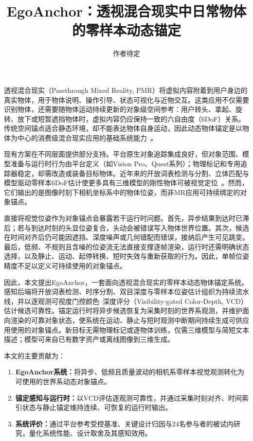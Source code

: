 \documentclass[review]{vgtc}
\title{EgoAnchor：透视混合现实中日常物体的零样本动态锚定}
\author{作者待定}
\begin{document}
\label{sec:introduction}
\maketitle

透视混合现实（Passthrough Mixed Reality, PMR）将虚拟内容附着到用户身边的真实物体，用于物体说明、操作引导、状态可视化与近物交互。这类应用不仅需要识别物体，还需要随物体运动持续更新的对象级空间参考：用户转头、拿起、旋转、放下或短暂遮挡物体时，虚拟内容仍应保持一致的六自由度（6DoF）关系。传统空间锚点适合静态环境，却不能表达物体自身运动，因此动态物体锚定是以物体为中心的消费级混合现实应用的基础系统能力~\cite{selfblending2026,gradualreality2024}。

现有方案在不同层面提供部分支持。平台原生对象追踪集成良好，但对象范围、模型准备与运行时行为由平台定义（如Vision Pro、Quest系列）；物理标记和专用追踪器稳定，却需改造或装备目标物体。近年来的开放词表检测与分割、立体匹配与模型驱动零样本6DoF估计使更多具有三维模型的刚性物体可被视觉定位~\cite{groundingdino2025,cutie2024,fastfoundationstereo2026,foundationpose2024,gigapose2024}。然而，它们输出的是图像时刻下相机坐标系中的物体位姿，而非MR应用可持续绑定的对象锚点。

直接将视觉位姿作为对象锚点会暴露若干运行时问题。首先，异步结果到达时已滞后；若与到达时刻的头显位姿复合，头动会被错误写入物体世界位置。其次，候选在时间对齐后仍可能因遮挡、深度噪声或几何错配而错误，接纳后产生可见跳变。最后，低频、不规则且含噪的位姿流无法直接支撑逐帧渲染，运行时还需明确状态选择，以及静止、运动、起停转换、短时失效与重新获取的行为。因此，单帧位姿精度不足以定义可持续使用的对象锚点。

因此，本文提出EgoAnchor，一套面向透视混合现实的零样本动态物体锚定系统。感知后端将开放词表检测、时序分割、双目深度与零样本位姿估计组织为持续流水线，并以逐观测可视度门控颜色--深度评分（Visibility-gated Color-Depth, VCD）估计候选可靠性。锚定运行时将异步候选恢复为采集时刻的世界系观测，并维护面向渲染的可靠对象状态，使系统在运动、静止与短时观测中断期间持续生成可供应用使用的对象锚点。新目标无需物理标记或逐物体训练，仅需三维模型与简短文本描述；模型可来自已有数字资产或离线图像到三维生成。

本文的主要贡献为：
\begin{enumerate}[leftmargin=1.8em,itemsep=1pt,topsep=2pt]
  \item \textbf{EgoAnchor系统：}将异步、低频且质量波动的相机系零样本视觉观测转化为可使用的世界系动态对象锚点。
  \item \textbf{锚定感知与运行时：}以VCD评估逐观测可靠性，并通过采集时刻对齐、时间索引状态与静止锚定维持连续、可恢复的运行时输出。
  \item \textbf{系统评价：}通过平台参考受控基准、关键设计归因与24名参与者的被试内研究，量化系统性能、设计取舍及其感知效用。
\end{enumerate}
\end{document}
